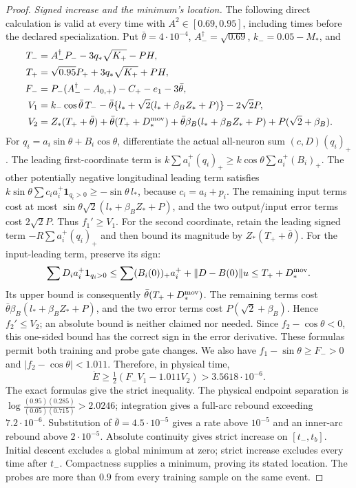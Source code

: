 \documentclass[11pt]{article}
\theoremstyle{remark}
\begin{document}
\begin{proof}
\emph{Signed increase and the minimum's location.}
The following direct calculation is valid at every time with
$A^2\in[0.69,0.95]$, including times before the declared specialization.
Put $\bar\theta=4\cdot10^{-4}$, $A_-^\dagger=\sqrt{0.69}$,
$k_-=0.05-M_*$, and
\begin{align*}
 T_-&=A_-^\dagger P_- -3q_*\sqrt{K_+}-PH,\\
 T_+&=\sqrt{0.95}P_++3q_*\sqrt{K_+}+PH,\\
 F_-&=P_-(A_-^\dagger-A_{0,+})-C_+-e_1-3\bar\theta,\\
 V_1&=k_-\cos\bar\theta\,T_-
   -\bar\theta\{l_*+\sqrt2(l_*+\beta_BZ_*+P)\}-2\sqrt2P,\\
 V_2&=Z_*(T_++\bar\theta)+\bar\theta(T_++D_*^{\rm mov})
   +\bar\theta\beta_B(l_*+\beta_BZ_*+P)+P(\sqrt2+\beta_B).
\end{align*}
For $q_i=a_i\sin\theta+B_i\cos\theta$, differentiate the actual
all-neuron sum $(c,D)(q_i)_+$. The leading first-coordinate term is
$k\sum a_i^+(q_i)_+\ge k\cos\theta\sum a_i^+(B_i)_+$.
The other potentially negative longitudinal leading term satisfies
$k\sin\theta\sum c_i a_i^+\mathbf1_{q_i>0}\ge-\sin\theta\,l_*$,
because $c_i=a_i+p_i$. The remaining input terms cost at most
$\sin\theta\sqrt2(l_*+\beta_BZ_*+P)$, and the two output/input error
terms cost $2\sqrt2P$. Thus $f_1'\ge V_1$.
For the second coordinate, retain the leading signed term
$-R\sum a_i^+(q_i)_+$ and then bound its magnitude by
$Z_*(T_++\bar\theta)$. For the input-leading term, preserve its sign:
\[
 \sum D_i a_i^+\mathbf1_{q_i>0}
 \le\sum (B_i(0))_+a_i^++\|D-B(0)\|u
 \le T_++D_*^{\rm mov}.
\]
Its upper bound is consequently $\bar\theta(T_++D_*^{\rm mov})$.
The remaining terms cost
$\bar\theta\beta_B(l_*+\beta_BZ_*+P)$, and the two error terms cost
$P(\sqrt2+\beta_B)$. Hence $f_2'\le V_2$; an absolute bound is neither
claimed nor needed. Since $f_2-\cos\theta<0$, this one-sided bound has
the correct sign in the error derivative.
These formulas permit both training and probe gate changes.
We also have $f_1-\sin\theta\ge F_->0$ and
$|f_2-\cos\theta|<1.011$. Therefore, in physical time,
\[
 \dot E\ge\tfrac12(F_-V_1-1.011V_2)>3.5618\cdot10^{-6}.
\]
The exact formulas give the strict inequality. The physical endpoint
separation is
$\log\frac{(0.95)(0.285)}{(0.05)(0.715)}>2.0246$; integration gives a
full-arc rebound exceeding $7.2\cdot10^{-6}$. Substitution of
$\bar\theta=4.5\cdot10^{-5}$ gives a rate above $10^{-5}$ and an
inner-arc rebound above $2\cdot10^{-5}$. Absolute continuity gives strict increase on $[t_-,t_b]$.
Initial descent excludes a global minimum at zero; strict increase
excludes every time after $t_-$. Compactness supplies a minimum, proving
its stated location. The probes are more than $0.9$ from every training
sample on the same event.
\end{proof}
\end{document}
